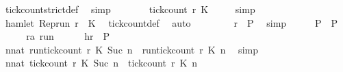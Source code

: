 \begin{isabellebody}
\ tick{\isacharunderscore}count{\isacharunderscore}strict{\isacharunderscore}def\ \isamarkupfalse%
\ simp\isanewline
\ \ \ \ \isamarkupfalse%
\ \isamarkupfalse%
\ {\isacartoucheopen}tick{\isacharunderscore}count\ r\ K\ {}\ {\isacharequal}\ {}{\isacartoucheclose}\ \isamarkupfalse%
\ simp\isanewline
\ \ \ \ \isamarkupfalse%
\ {\isacartoucheopen}{\isasymnot}hamlet\ {\isacharparenleft}{\isacharparenleft}Rep{\isacharunderscore}run\ r{\isacharparenright}\ {}\ K\ \isamarkupfalse%
\ tick{\isacharunderscore}count{\isacharunderscore}def\ \isamarkupfalse%
\ auto\isanewline
\ \ \ \ \isamarkupfalse%
\ {\isacharasterisk}\ \isamarkupfalse%
\ {\isacartoucheopen}r\ {\isasymin}\ {\isacharquery}P{\isacharprime}{\isacartoucheclose}\ \isamarkupfalse%
\ simp\isanewline
\ \ \isacommand{{\isacharbraceright}}\isamarkupfalse%
\ \isamarkupfalse%
\ {\isacartoucheopen}{\isacharquery}P\ {\isasymsubseteq}\ {\isacharquery}P{\isacharprime}{\isacartoucheclose}\ \isacommand{{\isachardot}{\isachardot}}\isamarkupfalse%
\isanewline
\ \ \isacommand{{\isacharbraceleft}}\isamarkupfalse%
\ \isamarkupfalse%
\ r{\isacharcolon}{\isacharcolon}{\isacartoucheopen}{\isacharprime}a\ run{\isacartoucheclose}\isanewline
\ \ \ \ \isamarkupfalse%
\ h{\isacharcolon}{\isacartoucheopen}r\ {\isasymin}\ {\isacharquery}P{\isacharprime}{\isacartoucheclose}\isanewline
\ \ \ \ \isamarkupfalse%
\ {\isacartoucheopen}{\isasymforall}n{\isacharcolon}{\isacharcolon}nat{\isachardot}\ {\isacharparenleft}run{\isacharunderscore}tick{\isacharunderscore}count\ r\ K\ {\isacharparenleft}Suc\ n{\isacharparenright}{\isacharparenright}\ {\isasymle}\ {\isacharparenleft}run{\isacharunderscore}tick{\isacharunderscore}count\ r\ K\ n{\isacharparenright}{\isacartoucheclose}\ \isamarkupfalse%
\ simp\isanewline
\ \ \ \ \isamarkupfalse%
\ {\isacartoucheopen}{\isasymforall}n{\isacharcolon}{\isacharcolon}nat{\isachardot}\ {\isacharparenleft}tick{\isacharunderscore}count\ r\ K\ {\isacharparenleft}Suc\ n{\isacharparenright}{\isacharparenright}\ {\isasymle}\ {\isacharparenleft}tick{\isacharunderscore}count\ r\ K\ n{\isacharparenright}{\isacartoucheclose}\isanewline

\end{isabellebody}
